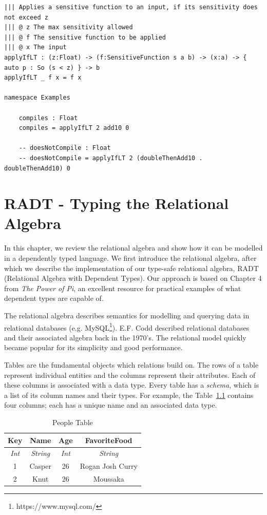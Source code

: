 \documentclass[12pt]{report}
\begin{document}
\begin{lstlisting}[caption={Sensitivity-aware function application},label={lst:sens_app}]
||| Applies a sensitive function to an input, if its sensitivity does not exceed z
||| @ z The max sensitivity allowed
||| @ f The sensitive function to be applied
||| @ x The input
applyIfLT : (z:Float) -> (f:SensitiveFunction s a b) -> (x:a) -> { auto p : So (s < z) } -> b
applyIfLT _ f x = f x

namespace Examples

    compiles : Float
    compiles = applyIfLT 2 add10 0

    -- doesNotCompile : Float
    -- doesNotCompile = applyIfLT 2 (doubleThenAdd10 . doubleThenAdd10) 0
\end{lstlisting}

\chapter{RADT - Typing the Relational Algebra}\label{sec:RADT}

In this chapter, we review the relational algebra and show how it can be modelled in a dependently typed language.
We first introduce the relational algebra, after which we describe the implementation of our type-safe relational algebra, RADT (Relational Algebra with Dependent Types).
Our approach is based on Chapter 4 from \textit{The Power of Pi}\cite{OurySwierstra08PowerOfPi}, an excellent resource for practical examples of what dependent types are capable of.

The relational algebra describes semantics for modelling and querying data in relational databases (e.g. MySQL\footnote{https://www.mysql.com/}).
E.F. Codd described relational databases and their associated algebra back in the 1970's\cite{codd70}.
The relational model quickly became popular for its simplicity and good performance.

Tables are the fundamental objects which relations build on.
The rows of a table represent individual entities and the columns represent their attributes.
Each of these columns is associated with a data type.
Every table has a \textit{schema}, which is a list of its column names and their types.
For example, the Table~\ref{tab:people_table} contains four columns; each has a unique name and an associated data type.

\begin{table}[tb]
    \caption{People Table}
    \label{tab:people_table}
    \centering

    \begin{tabular}{|c|c|c|c|}
    \hline

    \hline
    \textbf{Key} & \textbf{Name} & \textbf{Age} & \textbf{FavoriteFood} \\
    \hline
    \textit{Int} & \textit{String} & \textit{Int} & \textit{String} \\
    \hline
    \hline
       1 & Casper & 26 & Rogan Josh Curry \\
       2 & Knut & 26 & Moussaka \\
    \hline

    \end{tabular}
\end{table}
\end{document}
